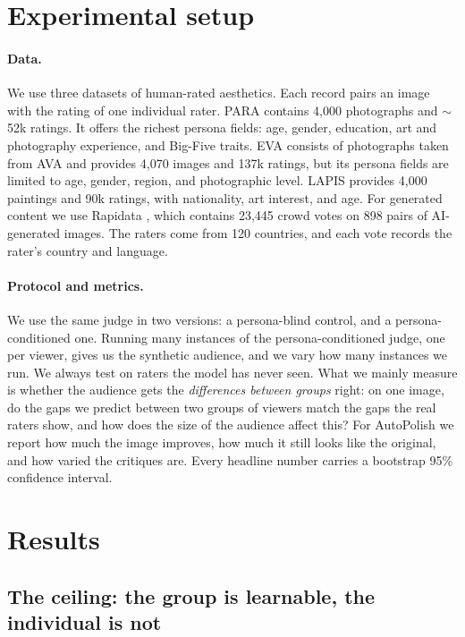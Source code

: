 \documentclass[10pt,twocolumn,letterpaper]{article}
\begin{document}
\section{Experimental setup}

\paragraph{Data.} We use three datasets of human-rated aesthetics. Each record pairs an image with the rating of one individual rater. PARA \citep{yang2022para} contains 4{,}000 photographs and $\sim$52k ratings. It offers the richest persona fields: age, gender, education, art and photography experience, and Big-Five traits. EVA \citep{kang2020eva} consists of photographs taken from AVA \citep{murray2012ava} and provides 4{,}070 images and 137k ratings, but its persona fields are limited to age, gender, region, and photographic level. LAPIS \citep{maerten2025lapis} provides 4{,}000 paintings and 90k ratings, with nationality, art interest, and age. For generated content we use Rapidata \citep{rapidata2024}, which contains 23{,}445 crowd votes on 898 pairs of AI-generated images. The raters come from 120 countries, and each vote records the rater's country and language.

\paragraph{Protocol and metrics.} We use the same judge in two versions: a persona-blind control, and a persona-conditioned one. Running many instances of the persona-conditioned judge, one per viewer, gives us the synthetic audience, and we vary how many instances we run. We always test on raters the model has never seen. What we mainly measure is whether the audience gets the \emph{differences between groups} right: on one image, do the gaps we predict between two groups of viewers match the gaps the real raters show, and how does the size of the audience affect this? For AutoPolish we report how much the image improves, how much it still looks like the original, and how varied the critiques are. Every headline number carries a bootstrap 95\% confidence interval.


\section{Results}

\subsection{The ceiling: the group is learnable, the individual is not}
\label{sec:ceiling}
\end{document}
